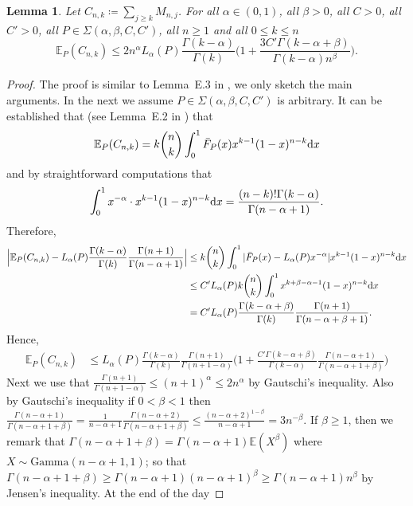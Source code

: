 \documentclass{article}
\newtheorem{lemma}{Lemma}
\newcommand{\1}{\boldsymbol{1}}
\newcommand{\EE}{\mathbb{E}}
\newcommand{\gammaDist}{\mathrm{Gamma}}
\theoremstyle{plain}
\begin{document}
\begin{lemma}
  \label{lem:8}
  Let $C_{n,k} \coloneqq \sum_{j\geq k}M_{n,j}$. For all $\alpha \in (0,1)$, all $\beta > 0$, all $C > 0$, all $C'>0$, all $P\in \Sigma(\alpha,\beta,C,C')$, all $n \geq 1$ and all $0 \leq k \leq n$
  \begin{equation*}
    \EE_P(C_{n,k})%
      \leq 2n^{\alpha}L_{\alpha}(P)\frac{\Gamma(k-\alpha)}{\Gamma(k)}\Bigg(1%
        + \frac{3C'\Gamma(k-\alpha+\beta)}{\Gamma(k-\alpha)n^{\beta}}\Bigg).
      \end{equation*}
\end{lemma}
\begin{proof}
  The proof is similar to Lemma~E.3 in \cite{Fav(22)}, we only sketch the main arguments. In the next we assume $P\in \Sigma(\alpha,\beta,C,C')$ is arbitrary. It can be established that (see Lemma~E.2 in \cite{Fav(22)}) that
  \begin{equation*}
    \EE_P(C_{n,k})%
    = k\binom{n}{k}\int_0^1\bar{F}_P(x)x^{k-1}(1-x)^{n-k}\intd x
  \end{equation*}
  and by straightforward computations that
  \begin{equation*}
    \int_0^1 x^{-\alpha}\cdot x^{k-1}(1-x)^{n-k}\intd x%
    = \frac{(n-k)!\Gamma(k-\alpha)}{\Gamma(n-\alpha+1)}.
  \end{equation*}
  Therefore,
  \begin{align}
    \notag
    \Big|\EE_P(C_{n,k}) - L_{\alpha}(P)\frac{\Gamma(k-\alpha)}{\Gamma(k)}\frac{\Gamma(n+1)}{\Gamma(n-\alpha + 1)} \Big|%
    &\leq k\binom{n}{k}\int_0^1|\bar{F}_P(x) - L_{\alpha}(P)x^{-\alpha}|x^{k-1}(1-x)^{n-k}\intd x\\
    \notag
    &\leq C'L_{\alpha}(P) k\binom{n}{k}\int_0^1x^{k +\beta - \alpha -1}(1-x)^{n-k}\intd x\\
    \label{eq:48jul}
    &= C' L_{\alpha}(P)\frac{\Gamma(k-\alpha+\beta)}{\Gamma(k)}\frac{\Gamma(n+1)}{\Gamma(n-\alpha+\beta+1)}.
  \end{align}
    Hence,
    \begin{align*}
      \EE_P(C_{n,k})%
      &\leq L_{\alpha}(P)\frac{\Gamma(k-\alpha)}{\Gamma(k)}\frac{\Gamma(n+1)}{\Gamma(n+1-\alpha)}\Bigg(1%
        + \frac{C'\Gamma(k-\alpha+\beta)}{\Gamma(k-\alpha)}\frac{\Gamma(n-\alpha+1)}{\Gamma(n-\alpha+1+\beta)}\Bigg)
    \end{align*}
    Next we use that $\frac{\Gamma(n+1)}{\Gamma(n+1-\alpha)} \leq (n+1)^{\alpha} \leq 2n^{\alpha}$ by Gautschi's inequality. Also by Gautschi's inequality if $0 < \beta < 1$ then $\frac{\Gamma(n-\alpha+1)}{\Gamma(n-\alpha+1+\beta)} = \frac{1}{n-\alpha+1}\frac{\Gamma(n-\alpha+2)}{\Gamma(n-\alpha+1+\beta)} \leq \frac{(n-\alpha+2)^{1-\beta}}{n-\alpha+1} = 3n^{-\beta}$. If $\beta \geq 1$, then we remark that $\Gamma(n-\alpha+1 + \beta) = \Gamma(n-\alpha+1)\EE(X^{\beta})$ where $X\sim \gammaDist(n-\alpha+1,1)$; so that $\Gamma(n-\alpha+1 + \beta) \geq \Gamma(n-\alpha+1)(n-\alpha+1)^{\beta}\geq \Gamma(n-\alpha+1)n^{\beta}$ by Jensen's inequality. At the end of the day

\end{proof}
\end{document}
